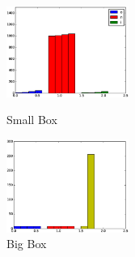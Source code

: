 \begin{figure}   
  \begin{minipage}[t]{0.5\linewidth}  
    \centering   
    \includegraphics[width=4.0cm]{images/onions-for-string.eps}   
    \caption{Small Box}   
    \label{fig:side:a}   
  \end{minipage}%
  \begin{minipage}[t]{0.5\linewidth}   
    \centering   
    \includegraphics[width=4.0cm]{images/onion-for-integer.eps}   
    \caption{Big Box}   
    \label{fig:side:b}   
  \end{minipage}   
\end{figure}















